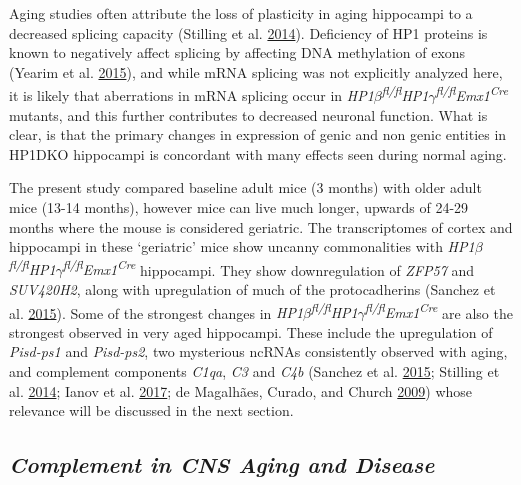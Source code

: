\documentclass[onehalf,12pt]{beavtex}
\begin{document}
  Aging studies often attribute the loss of plasticity in aging hippocampi
  to a decreased splicing capacity (Stilling et al.
  \protect\hyperlink{ref-StillingDeregulationgeneexpression2014}{2014}).
  Deficiency of HP1 proteins is known to negatively affect splicing by
  affecting DNA methylation of exons (Yearim et al.
  \protect\hyperlink{ref-YearimHP1InvolvedRegulating2015}{2015}), and
  while mRNA splicing was not explicitly analyzed here, it is likely that
  aberrations in mRNA splicing occur in
  \emph{HP1\(\beta\)\textsuperscript{fl/fl}HP1\(\gamma\)\textsuperscript{fl/fl}Emx1\textsuperscript{Cre}}
  mutants, and this further contributes to decreased neuronal function.
  What is clear, is that the primary changes in expression of genic and
  non genic entities in HP1DKO hippocampi is concordant with many effects
  seen during normal aging.
  
  The present study compared baseline adult mice (3 months) with older
  adult mice (13-14 months), however mice can live much longer, upwards of
  24-29 months where the mouse is considered geriatric. The transcriptomes
  of cortex and hippocampi in these `geriatric' mice show uncanny
  commonalities with
  \emph{HP1\(\beta\)\textsuperscript{fl/fl}HP1\(\gamma\)\textsuperscript{fl/fl}Emx1\textsuperscript{Cre}}
  hippocampi. They show downregulation of \emph{ZFP57} and
  \emph{SUV420H2}, along with upregulation of much of the protocadherins
  (Sanchez et al.
  \protect\hyperlink{ref-SanchezAgingApolipoproteinMolecular2015a}{2015}).
  Some of the strongest changes in
  \emph{HP1\(\beta\)\textsuperscript{fl/fl}HP1\(\gamma\)\textsuperscript{fl/fl}Emx1\textsuperscript{Cre}}
  are also the strongest observed in very aged hippocampi. These include
  the upregulation of \emph{Pisd-ps1} and \emph{Pisd-ps2}, two mysterious
  ncRNAs consistently observed with aging, and complement components
  \emph{C1qa}, \emph{C3} and \emph{C4b} (Sanchez et al.
  \protect\hyperlink{ref-SanchezAgingApolipoproteinMolecular2015a}{2015};
  Stilling et al.
  \protect\hyperlink{ref-StillingDeregulationgeneexpression2014}{2014};
  Ianov et al.
  \protect\hyperlink{ref-IanovHippocampalTranscriptomicProfiles2017}{2017};
  de Magalhães, Curado, and Church
  \protect\hyperlink{ref-deMagalhaesMetaanalysisagerelatedgene2009}{2009})
  whose relevance will be discussed in the next section.
  
  \subsection*{\texorpdfstring{\emph{Complement in CNS Aging and
  Disease}}{Complement in CNS Aging and Disease}}\label{complement-in-cns-aging-and-disease}
  
\end{document}
